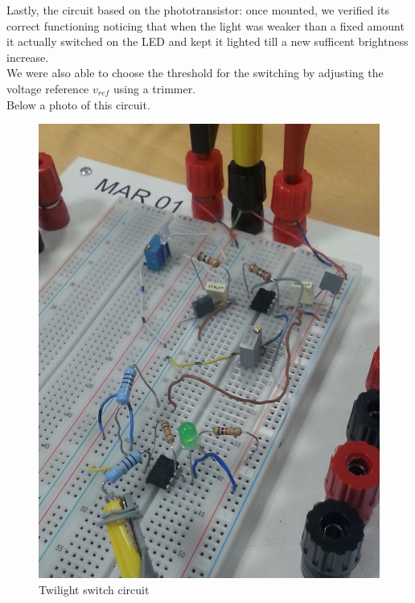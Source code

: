 Lastly, the circuit based on the phototransistor: once mounted, we verified its correct functioning noticing that when the light was weaker than a fixed amount it actually switched on the LED and kept it lighted till a new sufficent brightness increase.\\
We were also able to choose the threshold for the switching by adjusting the voltage reference $v_{ref}$ using a trimmer.\\
Below a photo of this circuit. 
\begin{figure}[H]
\centering
\includegraphics[width=.6\textwidth]{5/sw.jpg}
\caption{Twilight switch circuit}
\end{figure}
